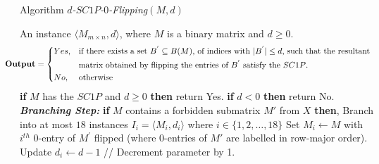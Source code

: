 \documentclass[review, 1p]{elsarticle}
\begin{document}
\begin{algorithm}[h]
\caption{Algorithm  \textit{$d$-$SC1P$-$0$-Flipping}$(M,d)$\label{alg3}}
\begin{algorithmic}[1] 
 \Require An instance $\langle M_{m \times n},d \rangle$, where $M$ is a binary matrix and $d \geq 0$.\vspace{-0.1 in} \[ \hspace{-0.26 in}\textbf{Output} = \begin{dcases*} Yes,  & if there exists a set $B^{'} \subseteq B(M)$, of indices with $\vert B^{'} \vert \leq d$, such that the resultant \\  
        & matrix obtained by  flipping the entries of  $B^{'}$ satisfy the $SC1P$.  
   \\  
   No,    & otherwise
\end{dcases*}
\] \vspace{-0.2 in} 
 \State \textbf{if} {$M$ has the $SC1P$ and $d \geq 0$} \textbf{then} return Yes. \vspace{-0.1 in}
 \State \textbf{if}  {$d < 0$} \textbf{then} return No.  \vspace{-0.05 in} \newline \vspace{-0.05 in}
\noindent \textit{\textbf{Branching Step:}}
 \vspace{0.03 in}
\State \textbf{if} {$M$ contains a forbidden submatrix $M'$ from $X$} \textbf{then},\vspace{-0.08 in}
\State  \indent Branch into at most $18$  instances $I_{i}=\langle M_{i}, d_{i}\rangle$ where $i \in \{1,2,\ldots,18\}$ \vspace{-0.08 in} \newline \vspace{-0.08 in} 
 \indent Set $M_{i} \leftarrow M$ with $i^{th}$ $0$-entry of $M^{'}$ flipped (where $0$-entries of $M'$ are labelled \vspace{-0.05 in} \indent \indent \indent \indent \indent \indent \indent \indent \indent \indent \indent in row-major order). \vspace{-0.03 in} \vspace{-0.03 in} \newline  \vspace{-0.03 in}
 \indent Update $d_{i} \leftarrow d -1$  \hspace{1.0 in}// Decrement parameter by 1.
\vspace{-0.03 in} \newline  \vspace{-0.03 in}

\end{algorithmic}
\end{algorithm}
\end{document}
